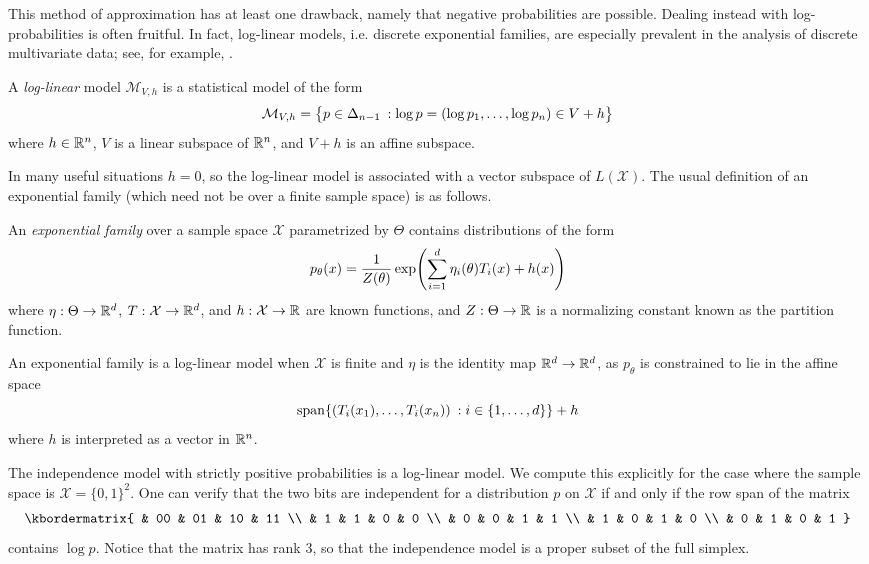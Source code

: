 \documentclass[cclicense]{hmcthesis}
\providecommand*{\xs}{\mathcal X}
\providecommand*{\ms}{\mathcal M}
\numberwithin{equation}{chapter}
\numberwithin{thmcounter}{chapter}
\begin{document}
    This method of approximation has at least one drawback, namely that negative
    probabilities are possible.  Dealing instead with log-probabilities is often
    fruitful.  In fact, log-linear models, i.e. discrete exponential families,
    are especially prevalent in the analysis of discrete multivariate data; see,
    for example, \citet{DMA}.
    \begin{definition}
        A \emph{log-linear} model $\ms_{V,h}$ is a statistical model of the form
        \[
            \ms_{V,h} = \cdel[\big]{p \in \Delta_{n-1} \:: \log p = (\log p_1, \ldots,
            \log p_n) \in V + h}
        \]
        where $h \in \mathbb{R}^n$, $V$ is a linear subspace of $\mathbb{R}^n$, and $V + h$ is
        an affine subspace.
    \end{definition}

    In many useful situations $h = 0$, so the log-linear model is associated
    with a vector subspace of $L(\xs)$.
    The usual definition of an exponential family (which need not be over a
    finite sample space) is as follows.
    \begin{definition}
        An \emph{exponential family} over a sample space $\xs$ parametrized by
        $\Theta$ contains distributions of the form
        \[
            p_\theta(x) = 
            \frac 1 {Z(\theta)}
            \exp\pdel*{
                \displaystyle \sum_{i=1}^d \eta_i(\theta)T_i(x) + h(x)
            }
        \]
        where $\eta : \Theta \to \mathbb{R}^d$, $T:\xs \to \R^d$, and $h: \xs \to \R$
        are known functions, and $Z:\Theta \to \mathbb{R}$ is a normalizing constant
        known as the partition function.
    \end{definition}
    An exponential family is a log-linear model when $\xs$ is finite and $\eta$
    is the identity map $\mathbb{R}^d \to \mathbb{R}^d$, as $p_\theta$ is constrained to lie in
    the affine space
    \[
        \mathrm{span}\cdel*{
            (T_i(x_1), \ldots, T_i(x_n)) \:: i \in \{1, \ldots, d\}
        } + h
    \]
    where $h$ is interpreted as a vector in $\mathbb{R}^n$.  

    \begin{example}
        The independence model with strictly positive probabilities is a
        log-linear model.  We compute this explicitly for the case where the
        sample space is $\xs = \{0, 1\}^2$.  One can verify that the two bits
        are independent for a distribution $p$ on $\xs$ if and only if 
        the row span of the matrix
        \[
            \kbordermatrix{
                & 00 & 01 & 10 & 11 \\
                &  1 &  1 &  0 &  0 \\
                &  0 &  0 &  1 &  1 \\
                &  1 &  0 &  1 &  0 \\
                &  0 &  1 &  0 &  1
            }
        \]
        contains $\log p$.  Notice that the matrix has rank 3, so that the
        independence model is a proper subset of the full simplex.
    \end{example}
\end{document}
